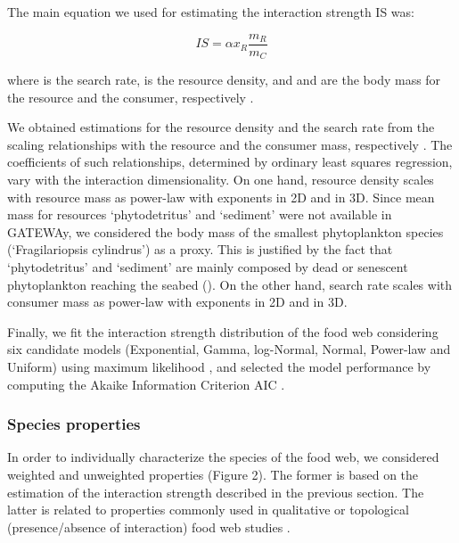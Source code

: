 \documentclass[gc, manuscript]{copernicus}
\begin{document}
The main equation we used for estimating the interaction strength IS
was:

\begin{equation}
IS = \alpha x_R \frac{m_R}{m_C}
\end{equation}

where \vec{\alpha} is the search rate,  is the resource
density, and  and  are the body mass for the resource
and the consumer, respectively \citep{Pawar2012}.

We obtained estimations for the resource density and the search rate
from the scaling relationships with the resource and the consumer mass,
respectively \citep{Pawar2012}. The coefficients of such relationships,
determined by ordinary least squares regression, vary with the
interaction dimensionality. On one hand, resource density scales with
resource mass as power-law with exponents  in 2D
and  in 3D. Since mean mass for resources
`phytodetritus' and `sediment' were not available in GATEWAy, we
considered the body mass of the smallest phytoplankton species
(`Fragilariopsis cylindrus') as a proxy. This is justified by the fact
that `phytodetritus' and `sediment' are mainly composed by dead or
senescent phytoplankton reaching the seabed (\citet{Wolanski2011}). On
the other hand, search rate scales with consumer mass as power-law with
exponents  in 2D and  in
3D.

Finally, we fit the interaction strength distribution of the food web
considering six candidate models (Exponential, Gamma, log-Normal,
Normal, Power-law and Uniform) using maximum likelihood
\citep{McCallum2008}, and selected the model performance by computing
the Akaike Information Criterion AIC \citep{Burnham2002}.

\subsubsection{Species properties}

In order to individually characterize the species of the food web, we
considered weighted and unweighted properties (Figure 2). The former is
based on the estimation of the interaction strength described in the
previous section. The latter is related to properties commonly used in
qualitative or topological (presence/absence of interaction) food web
studies \citep{Martinez1991, Dunne2002, Borrelli2014}.
\end{document}
